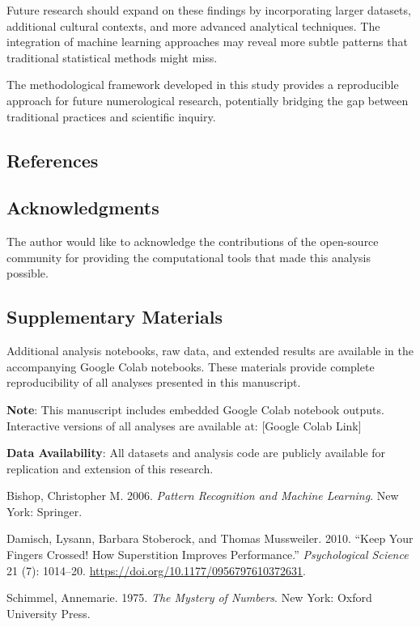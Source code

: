\documentclass[
  11pt,
]{article}
\newlength{\cslhangindent}
\newenvironment{CSLReferences}[2] %
 {\begin{list}{}{%
  \setlength{\itemindent}{0pt}
  \setlength{\leftmargin}{0pt}
  \setlength{\parsep}{0pt}
  \ifodd #1
   \setlength{\leftmargin}{\cslhangindent}
   \setlength{\itemindent}{-1\cslhangindent}
  \fi
  \setlength{\itemsep}{#2\baselineskip}}}
 {\end{list}}
\begin{document}
Future research should expand on these findings by incorporating larger
datasets, additional cultural contexts, and more advanced analytical
techniques. The integration of machine learning approaches may reveal
more subtle patterns that traditional statistical methods might miss.

The methodological framework developed in this study provides a
reproducible approach for future numerological research, potentially
bridging the gap between traditional practices and scientific inquiry.

\subsection{References}\label{references}

\subsection{Acknowledgments}\label{acknowledgments}

The author would like to acknowledge the contributions of the
open-source community for providing the computational tools that made
this analysis possible.

\subsection{Supplementary Materials}\label{supplementary-materials}

Additional analysis notebooks, raw data, and extended results are
available in the accompanying Google Colab notebooks. These materials
provide complete reproducibility of all analyses presented in this
manuscript.

\textbf{Note}: This manuscript includes embedded Google Colab notebook
outputs. Interactive versions of all analyses are available at:
{[}Google Colab Link{]}

\textbf{Data Availability}: All datasets and analysis code are publicly
available for replication and extension of this research.

\label{refs}
\begin{CSLReferences}{1}{0}
Bishop, Christopher M. 2006. \emph{Pattern Recognition and Machine
Learning}. New York: Springer.

Damisch, Lysann, Barbara Stoberock, and Thomas Mussweiler. 2010. {``Keep
Your Fingers Crossed! How Superstition Improves Performance.''}
\emph{Psychological Science} 21 (7): 1014--20.
\url{https://doi.org/10.1177/0956797610372631}.

Schimmel, Annemarie. 1975. \emph{The Mystery of Numbers}. New York:
Oxford University Press.

\end{CSLReferences}
\end{document}
